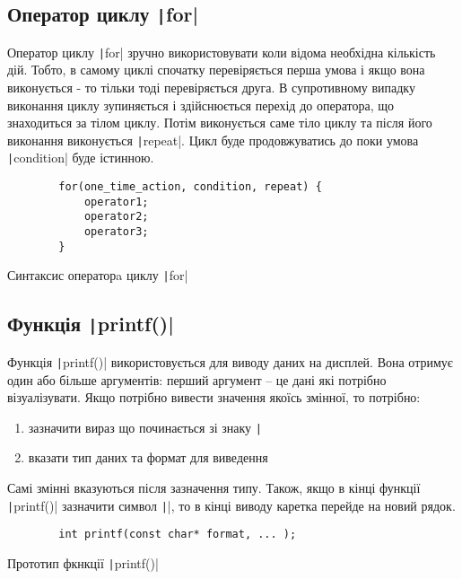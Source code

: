 \subsection[Цикл \code{for}]{Оператор циклу \texttt|for|}
Оператор циклу \texttt|for| зручно використовувати коли відома необхідна кількість дій. Тобто, в самому циклі спочатку перевіряється перша умова і якщо вона виконується - то тільки тоді перевіряється друга. В супротивному випадку виконання циклу зупиняється і здійснюється перехід до оператора, що знаходиться за тілом циклу. Потім виконується саме тіло циклу та після його виконання виконується \texttt|repeat|. Цикл буде продовжуватись до поки умова \texttt|condition| буде істинною.
\begin{listing}[H]
	\begin{verbatim}
		for(one_time_action, condition, repeat) {
			operator1;
			operator2;
			operator3;
		}
	\end{verbatim}
	\caption[Синтаксис ]{Синтаксис операторa циклу \texttt|for|}
	\label{lst:forloop}
\end{listing}

\subsection[Функція \code{printf()}]{Функція \texttt|printf()|}
Функція \texttt|printf()| використовується для виводу даних на дисплей. Вона отримує один або більше аргументів: перший аргумент – це дані які потрібно візуалізувати. Якщо потрібно вивести значення якоїсь змінної, то потрібно: 
\begin{enumerate}
	\item зазначити вираз що починається зі знаку \texttt|%
	\item вказати тип даних та формат для виведення
\end{enumerate}
Самі змінні вказуються після зазначення типу. Також, якщо в кінці функції \texttt|printf()| зазначити символ \texttt|\n|, то в кінці виводу каретка перейде на новий рядок.
\begin{listing}[H]
	\begin{verbatim}
		int printf(const char* format, ... );
	\end{verbatim}
	\caption[Прототип ]{Прототип фкнкції \texttt|printf()|}
	\label{lst:f:printf}
\end{listing}
